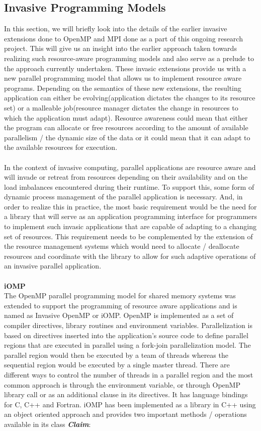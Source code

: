 \subsection{Invasive Programming Models}
In this section, we will briefly look into the details of the earlier invasive extensions done to OpenMP and MPI done as a part of this ongoing research project. This will give us an insight into the earlier approach taken towards realizing such resource-aware programming models and also serve as a prelude to the approach currently undertaken. These invasic extensions provide us with a new parallel programming model that allows us to implement resource aware programs. Depending on the semantics of these new extensions, the resulting application can either be evolving(application dictates the changes to its resource set) or a malleable job(resource manager dictates the change in resources to which the application must adapt). Resource awareness could mean that either the program can allocate or free resources according to the amount of available parallelism / the dynamic size of the data or it could mean that it can adapt to the available resources for execution.\\ \\
In the context of invasive computing, parallel applications are resource aware and will invade or retreat from resources depending on their availability and on the load imbalances encountered during their runtime. To support this, some form of dynamic process management of the parallel application is necessary. And, in order to realize this in practice, the most basic requirement would be the need for a library that will serve as an application programming interface for programmers to implement such invasic applications that are capable of adapting to a changing set of resources. This requirement needs to be complemented by the extension of the resource management systems which would need to allocate / deallocate resources and coordinate with the library to allow for such adaptive operations of an invasive parallel application.\\ \\
\textbf{iOMP}\\
The OpenMP parallel programming model for shared memory systems was extended to support the programming of resource aware applications and is named as Invasive OpenMP or iOMP. OpenMP is implemented as a set of compiler directives, library routines and environment variables. Parallelization is based on directives inserted into the application's source code to define parallel regions that are executed in parallel using a fork-join parallelization model. The parallel region would then be executed by a team of threads whereas the sequential region would be executed by a single master thread. There are different ways to control the number of threads in a parallel region and the most common approach is through the environment variable, or through OpenMP library call or as an additional clause in its directives. It has language bindings for C, C++ and Fortran. iOMP has been implemented as a library in C++ using an object oriented approach and provides two important methods / operations available in its class \textbf{\textit{Claim}}:

